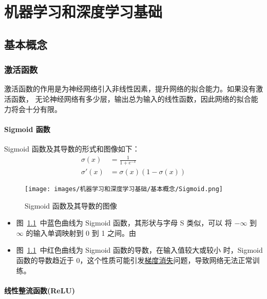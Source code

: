 \part{机器学习和深度学习基础}

\chapter{基本概念}

\section{激活函数}

激活函数的作用是为神经网络引入非线性因素，提升网络的拟合能力。如果没有激活函数，
无论神经网络有多少层，输出总为输入的线性函数，因此网络的拟合能力将会十分有限。

\subsection{Sigmoid 函数}
\label{subsec:Sigmoid}

Sigmoid 函数及其导数的形式和图像如下：
\begin{align}
  \label{equ:sigmoid}
  \sigma(x) & = \frac{1}{1 + e^{-x}} \\
  \label{equ:sigmoid-d}
  \sigma'(x) & = \sigma(x) (1-\sigma(x))
\end{align}

\begin{figure}[ht]
  \centering
  \texttt{[image: images/机器学习和深度学习基础/基本概念/Sigmoid.png]}
  \caption{Sigmoid 函数及其导数的图像}
  \label{fig:sigmoid}
\end{figure}

\begin{itemize}
\item 图~\ref{fig:sigmoid}~中蓝色曲线为 Sigmoid 函数，其形状与字母 S 类似，可以
  将 $-\infty$ 到 $\infty$ 的输入单调映射到 0 到 1 之间。由
\item 图~\ref{fig:sigmoid}~中红色曲线为 Sigmoid 函数的导数，在输入值较大或较小
  时，Sigmoid 函数的导数趋近于 0，这个性质可能引发\hyperref[subsec:gradient-vanish-explosion]{梯度消失}问题，导致网络无法正常训练。
\end{itemize}

\subsection{线性整流函数(ReLU)}

